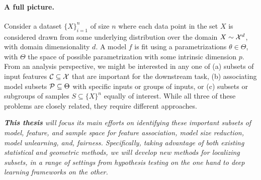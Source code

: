 \paragraph{A full picture.} Consider a dataset $\{X\}_{i=1}^n$ of size $n$ where each data point in the set $X$ is considered drawn from some underlying distribution over the domain $X \sim \mathcal{X}^d$, with domain dimensionality $d$. A model $f$ is fit using a parametrizations $\theta \in \Theta$, with $\Theta$ the space of possible parametrization with some intrinsic dimension $p$. From an analysis perspective, we might be interested in any one of (a) subsets of input features $\mathcal{C} \subseteq \mathcal{X}$ that are important for the downstream task, (b) associating model subsets $\mathcal{P} \subseteq \Theta$ with specific inputs or groups of inputs, or (c) subsets or subgroups of samples $S \subseteq \{X\}^n$ equally of interest. While all three of these problems are closely related, they require different approaches. 

\begin{mdframed}[style=MyFrame]
\em 
\textbf{This thesis} will focus its main efforts on identifying these important subsets of model, feature, and sample space for feature association, model size reduction, model unlearning, and, fairness. Specifically, taking advantage of both existing statistical and geometric methods, we will develop new methods for localizing subsets, in a range of settings from hypothesis testing on the one hand to deep learning frameworks on the other.
\end{mdframed}

